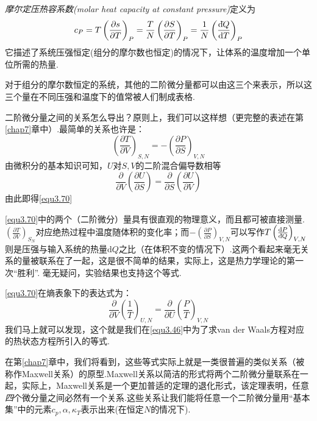 {\it 摩尔定压热容系数(molar heat capacity at constant pressure)}定义为
\begin{equation}
\label{equ3.69}
c_P=T\left(\frac{\partial s}{\partial T}\right)_P=\frac{T}{N}\left(\frac{\partial S}{\partial T}\right)_P=\frac{1}{N}\left(\frac{\mathrm d\hspace*{-0.1em}\bar{}\hspace*{0.08em} Q}{\text{d}T}\right)_P
\end{equation}
它描述了系统压强恒定(组分的摩尔数也恒定)的情况下，让体系的温度增加一个单位所需的热量.

对于组分的摩尔数恒定的系统，其他的二阶微分量都可以由这三个来表示，所以这三个量在不同压强和温度下的值常被人们制成表格.

二阶微分量之间的关系怎么导出？原则上，我们可以这样想（更完整的表述在第\ref{chap7}章中）.最简单的关系也许是：
\begin{equation}
\label{equ3.70}
\left(\frac{\partial T}{\partial V}\right)_{S,N}=-\left(\frac{\partial P}{\partial S}\right)_{V,N}
\end{equation}
由微积分的基本知识可知，$U$对$S,V$的二阶混合偏导数相等
\begin{equation}
\label{3.71}
\frac{\partial}{\partial V}\left(\frac{\partial U}{\partial S}\right)=\frac{\partial}{\partial S}\left(\frac{\partial U}{\partial V}\right)
\end{equation}
由此即得\eqref{equ3.70}

\eqref{equ3.70}中的两个（二阶微分）量具有很直观的物理意义，而且都可被直接测量. $\left(\frac{\partial T}{\partial V}\right)_{S_N}$对应绝热过程中温度随体积的变化率；而$-\left(\frac{\partial P}{\partial S}\right)_{V,N}$可以写作$T\left(\frac{\text{d} P}{\mathrm d\hspace*{-0.1em}\bar{}\hspace*{0.08em} Q}\right)_{V,N}$则是压强与输入系统的热量$\text{d}Q$之比（在体积不变的情况下）.这两个看起来毫无关系的量被联系在了一起，这是很不简单的结果，实际上，这是热力学理论的第一次“胜利”. 毫无疑问，实验结果也支持这个等式.

\eqref{equ3.70}在熵表象下的表达式为：
\begin{equation}
\label{equ3.72}
\frac{\partial }{\partial V}\left(\frac{1}{T}\right)_{U,N}=\frac{\partial }{\partial U}\left(\frac{P}{T}\right)_{V,N}
\end{equation}
我们马上就可以发现，这个就是我们在\eqref{equ3.46}中为了求van der Waals方程对应的热状态方程所引入的等式.

在第\ref{chap7}章中，我们将看到，这些等式实际上就是一类很普遍的类似关系（被称作Maxwell关系）的原型.Maxwell关系以简洁的形式将两个二阶微分量联系在一起，实际上，Maxwell关系是一个更加普适的定理的退化形式，该定理表明，任意{\it 四}个微分量之间必然有一个关系.这些关系让我们能将任意一个二阶微分量用“基本集”中的元素$c_p,\alpha,\kappa_T$表示出来(在恒定$N$的情况下).


